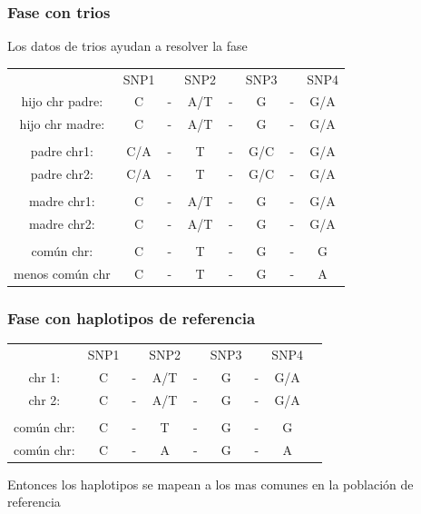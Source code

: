 \documentclass{beamer}\usepackage[]{graphicx}\usepackage[]{color}
\begin{document}
\begin{frame}
\frametitle{Fase con trios}
Los datos de trios ayudan a resolver la fase
\begin{table}[]
\centering
\begin{tabular}{cccccccc}
      &SNP1& &SNP2 & & SNP3 & & SNP4\\
hijo chr padre: &C   &-&  A/T&-& G &-& G/A\\
hijo chr madre: &C   &-&  A/T&-& G &-& G/A\\ 
& & & &\\
padre chr1: &C/A   &-&  T&-& G/C &-& G/A\\
padre chr2: &C/A   &-&  T&-& G/C &-& G/A\\ 
& & & &\\
madre chr1: &C   &-&  A/T&-& G &-& G/A \\
madre chr2: &C   &-&  A/T&-& G &-& G/A\\ 
& & & &\\
com\'un chr: & C  &-&  T &-& G &-& G\\
menos com\'un chr & C  &-&  T &-& G &-& A\\

\end{tabular}

\end{table}
\end{frame}



\begin{frame}
\frametitle{Fase con haplotipos de referencia}
\begin{table}[]
\centering
\begin{tabular}{ccccccccc}
      &SNP1& &SNP2 & & SNP3 & & SNP4\\
chr 1: &C   &-&  A/T&-& G &-& G/A\\
chr 2: &C   &-&  A/T&-& G &-& G/A\\ 
& & & &\\
com\'un chr: & C  &-&  T &-& G &-& G\\
com\'un chr: & C  &-&  A &-& G &-& A\\
\end{tabular}
\end{table}
Entonces los haplotipos se mapean a los mas comunes en la poblaci\'on de referencia

\end{frame}
\end{document}
